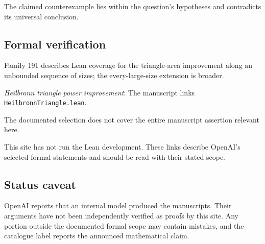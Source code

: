 \documentclass[11pt]{article}
\begin{document}
The claimed counterexample lies within the question’s hypotheses and contradicts its universal conclusion.

\subsection{Formal verification}
Family 191 describes Lean coverage for the triangle-area improvement along an unbounded sequence of sizes; the every-large-size extension is broader.

\textit{Heilbronn triangle power improvement}: The manuscript links \texttt{HeilbronnTriangle.lean}.

The documented selection does not cover the entire manuscript assertion relevant here.

This site has not run the Lean development. These links describe OpenAI’s selected formal statements and should be read with their stated scope.

\subsection{Status caveat}
OpenAI reports that an internal model produced the manuscripts. Their arguments have not been independently verified as proofs by this site. Any portion outside the documented formal scope may contain mistakes, and the catalogue label reports the announced mathematical claim.
\end{document}
